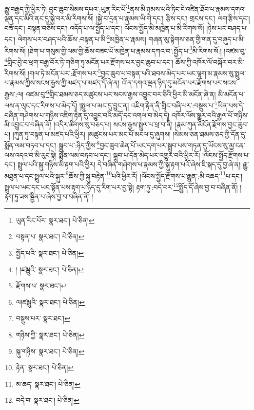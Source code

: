 རྒྱུ་བརྒྱད་ཀྱི་ཕྱིར་ཏེ། བྱང་ཆུབ་སེམས་དཔའ་:ཡུན་རིང་པོ་\footnote{ཡུན་རིང་པོར་  སྣར་ཐང་།  པེ་ཅིན། }ནས་མི་ཉམས་པའི་ཏིང་ངེ་འཛིན་ཐོབ་པ་རྣམས་དགའ་ལྡན་དང་མིའི་ནང་དུ་སྐྱེ་བར་མི་རིགས་སོ། །སྐྱེ་བ་དྲན་པ་རྣམས་ཡི་གེ་དང་། རྩིས་དང་། གྲངས་དང་། ལག་རྩིས་དང་། བཟོ་དང་། བསྟན་བཅོས་དང་། འདོད་པ་ལ་སྤྱོད་པ་དང་། ལོངས་སྤྱོད་མི་མཁྱེན་པ་མི་རིགས་སོ། །ཉེས་པར་བཤད་པ་དང་། ལེགས་པར་བཤད་པའི་ཆོས་:བསྟན་པ་མི་\footnote{བསྟན་པ་  སྣར་ཐང་།  པེ་ཅིན། }མཁྱེན་པ་རྣམས། གཞན་མུ་སྟེགས་ཅན་གྱི་གན་དུ་བཞུད་པ་མི་རིགས་སོ། །ཐེག་པ་གསུམ་གྱི་ལམ་གྱི་ཆོས་བཟང་པོ་མཁྱེན་པ་རྣམས་དཀའ་བ་:སྤྱོད་པ་\footnote{སྤྱོད་པའི་  སྣར་ཐང་།  པེ་ཅིན། }མི་རིགས་སོ:། །འཛམ་བུ་\footnote{། །ཛམྦུའི་  སྣར་ཐང་།  པེ་ཅིན། }གླིང་བྱེ་བ་ཕྲག་བརྒྱ་བོར་ཏེ་གཅིག་ཏུ་མངོན་པར་རྫོགས་པར་བྱང་ཆུབ་པ་དང་། ཆོས་ཀྱི་འཁོར་ལོ་བསྐོར་བར་མི་རིགས་སོ། །གལ་ཏེ་མངོན་པར་:རྫོགས་པར་\footnote{རྫོགས་པ་  སྣར་ཐང་། }བྱང་ཆུབ་པ་བསྟན་པའི་ཐབས་མེད་པར་ཡང་ལྷག་མ་རྣམས་སུ་སྤྲུལ་པ་རྣམས་ཀྱིས་སངས་རྒྱས་ཀྱི་མཛད་པ་མཛད་དོ་ཞེ་ན། འོ་ན་དགའ་ལྡན་ཉིད་དུ་མངོན་པར་རྫོགས་པར་སངས་རྒྱས་:ལ། འཛམ་བུ་\footnote{ལ།ཛམྦུའི་  སྣར་ཐང་།  པེ་ཅིན། }གླིང་ཐམས་ཅད་མཚུངས་པར་སངས་རྒྱས་འབྱུང་བར་ཅིའི་ཕྱིར་མི་མངོན་ཞེ་ན། མི་མངོན་པ་ལས་ན་ལུང་དང་རིགས་པ་མེད་དོ། །སྤྲུལ་པ་མང་དུ་བྱུང་ན། འཇིག་རྟེན་ནི་གླིང་བཞི་པར་:བསྡུས་པ་\footnote{བསྡུས་པར་  སྣར་ཐང་། }ཡིན་པས་དེ་བཞིན་གཤེགས་པ་གཉིས་འཇིག་རྟེན་དུ་འབྱུང་བའི་མདོ་དང་འགལ་བ་མེད་དེ། འཁོར་ལོས་སྒྱུར་བའི་རྒྱལ་པོ་གཉིས་མི་འབྱུང་བ་བཞིན་ནོ། །འདིར་ཚིགས་སུ་བཅད་པ། སངས་རྒྱས་སྤྲུལ་པ་ཕྲ་བ་ནི། །རྣམ་ཀུན་མངོན་རྫོགས་བྱང་ཆུབ་པ། །ཀུན་ཏུ་བསྟན་པ་མཛད་པའི་ཕྱིར། །མཚུངས་པར་མང་པོ་མངལ་དུ་ཞུགས། །སེམས་ཅན་ཐམས་ཅད་ཀྱི་དོན་དུ་སྨོན་ལམ་བཏབ་པ་དང་། སྒྲུབ་པ་:ཉིད་ཀྱིས་\footnote{གཉིས་ཀྱི་  སྣར་ཐང་།  པེ་ཅིན། }བྱང་ཆུབ་ཆེན་པོ་ཡང་དག་པར་སྒྲུབ་པས་གཏན་དུ་ཡོངས་སུ་མྱ་ངན་ལས་འདའ་བ་མི་རུང་སྟེ། སྨོན་ལམ་བཏབ་པ་དང་། སྒྲུབ་པ་དོན་མེད་པར་འགྱུར་བའི་ཕྱིར་རོ། །ལོངས་སྤྱོད་རྫོགས་པ་དང་། སྤྲུལ་པའི་སྐུ་གཉིས་མི་རྟག་པའི་ཕྱིར། དེ་བཞིན་གཤེགས་པ་རྣམས་ཀྱི་སྐུ་རྟག་པའོ་ཞེས་ཇི་སྐད་དུ་བྱ་ཞེ་ན། རྒྱུ་མཐུན་པ་དང་སྤྲུལ་པའི་སྐུར་\footnote{སྐུ་གཉིས་  སྣར་ཐང་།  པེ་ཅིན། }ཆོས་ཀྱི་སྐུ་བརྟེན་\footnote{རྟེན་  སྣར་ཐང་།  པེ་ཅིན། }པའི་ཕྱིར་རོ། །ལོངས་སྤྱོད་རྫོགས་པ་རྒྱུན་:མི་འཆད་\footnote{མ་ཆད་  སྣར་ཐང་།  པེ་ཅིན། }པ་དང་། སྤྲུལ་པ་ཡང་དང་ཡང་སྟོན་པས་རྟག་པ་ཉིད་དུ་རིག་པར་བྱ་སྟེ། རྟག་ཏུ་:བདེ་བར་\footnote{བདེ་བ་  སྣར་ཐང་།  པེ་ཅིན། }སྤྱོད་དོ་ཞེས་བྱ་བ་བཞིན་ནོ། །རྟག་ཏུ་ཟས་སྦྱིན་པ་ཞེས་བྱ་བ་བཞིན་ནོ། །
